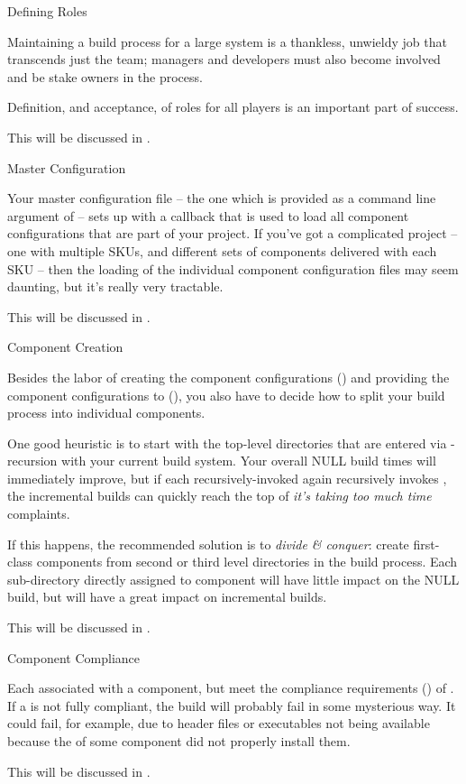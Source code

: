 \begin{description}
\item Defining Roles

  Maintaining a build process for a large system is a thankless,
  unwieldy job that transcends just the \bni team; managers and
  developers must also become involved and be stake owners in the
  process.

  Definition, and acceptance, of roles for all players is an important
  part of success.

  This will be discussed in .

\item Master Configuration

  Your master configuration file -- the one which is provided as a
  command line argument of \lmsbw -- sets up \lmsbw with a callback
  that is used to load all component configurations that are part of
  your project.  If you've got a complicated project -- one with
  multiple SKUs, and different sets of components delivered with each
  SKU -- then the loading of the individual component configuration
  files may seem daunting, but it's really very tractable.

  This will be discussed in .

\item Component Creation


  Besides the labor of creating the component configurations
  () and providing the component
  configurations to \lmsbw (), you also have to
  decide how to split your build process into individual components.

  One good heuristic is to start with the top-level directories that
  are entered via \make-recursion with your current build system.  Your
  overall NULL build times will immediately improve, but if each
  recursively-invoked \makefile  again recursively invokes \make,
  the incremental builds can quickly reach the top of \emph{it's
    taking too much time} complaints.

  If this happens, the recommended solution is to \emph{divide \&
    conquer}: create first-class components from second or third level
  directories in the build process.  Each sub-directory directly
  assigned to component will have little impact on the NULL build, but
  will have a great impact on incremental builds.

  This will be discussed in .

\item Component \makefile Compliance

  Each \makefile associated with a component, but meet the compliance
  requirements () of \lmsbw.  If a
  \makefile is not fully compliant, the build will probably fail in
  some mysterious way.  It could fail, for example, due to header
  files or executables not being available because the \makefile of
  some component did not properly install them.

  This will be discussed in .

\end{description}

